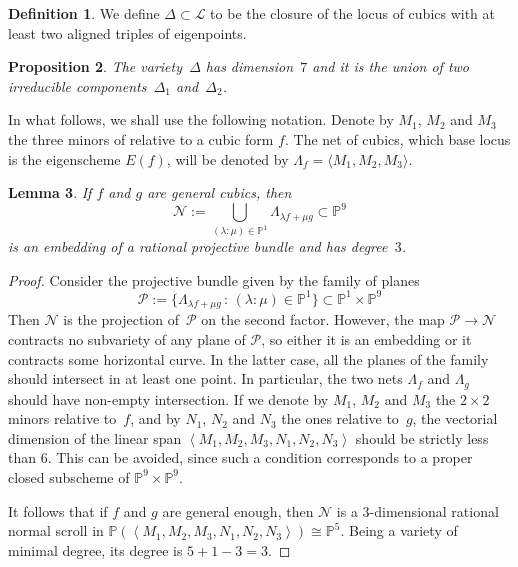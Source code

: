 \documentclass[12pt, a4paper, reqno, captions=tableheading,bibliography=totoc]{scrartcl}
\theoremstyle{plain}
\newtheorem{lemma}{Lemma}[section]
\newtheorem{prop}[lemma]{Proposition}
\theoremstyle{definition}
\newtheorem{definition}[lemma]{Definition}
\newcommand{\p}{\mathbb{P}}
\begin{document}
\begin{definition}
 We define $\Delta \subset \mathcal{L}$ to be the closure of the locus of cubics with at least two aligned triples of eigenpoints.
\end{definition}

\begin{prop}
  The variety~$\Delta$ has dimension~$7$ and it is the union of two irreducible components~$\Delta_1$ and~$\Delta_2$.
\end{prop}

In what follows, we shall use the following notation.
Denote by $M_1$, $M_2$ and $M_3$ the three minors of  relative to a cubic form $f$.
The net of cubics, which base locus is the eigenscheme $E(f)$, will be denoted by $\Lambda_f = \langle M_1, M_2, M_3 \rangle$.
\begin{lemma}
\label{lemma:scroll}
 If $f$ and $g$ are general cubics, then
 \[
   \mathcal{N} := \bigcup_{(\lambda : \mu) \in \p^1} \Lambda_{\lambda f + \mu g} \subset \p^9
 \]
 is an embedding of a rational projective bundle and has degree~$3$.
\end{lemma}
\begin{proof}
Consider the projective bundle given by the family of planes
%
\[
{\mathcal P} := \{ \Lambda_{\lambda f + \mu g} \, : \, (\lambda: \mu)\in \p^1 \} \subset \p^1 \times \p^9
\]
%
Then $\mathcal{N}$ is the projection of~$\mathcal{P}$ on the second factor.
However, the map ${\mathcal P} \to {\mathcal N}$ contracts no subvariety of any plane of ${\mathcal P}$, so either it is an embedding or it contracts some horizontal curve. In the latter case, all the planes of the family should intersect in at least one point. In particular, the two nets $\Lambda_f$ and $\Lambda_g$ should have non-empty intersection.
If we denote by $M_1$, $M_2$ and $M_3$ the $2 \times 2$ minors relative to~$f$, and by $N_1$, $N_2$ and $N_3$ the ones relative to~$g$, the vectorial dimension of the linear span $\left\langle M_1, M_2, M_3, N_1, N_2, N_3 \right\rangle$ should be strictly less than $6$. This can be avoided, since such a condition corresponds to a proper closed subscheme of $\p^9 \times \p^9$.

It follows that if $f$ and $g$ are general enough, then $\mathcal{N}$ is a $3$-dimensional rational normal scroll in $\p(\left\langle M_1, M_2, M_3, N_1, N_2, N_3 \right\rangle) \cong \p^5$.
Being a variety of minimal degree, its degree is $5+1-3 = 3$.
\end{proof}
\end{document}
